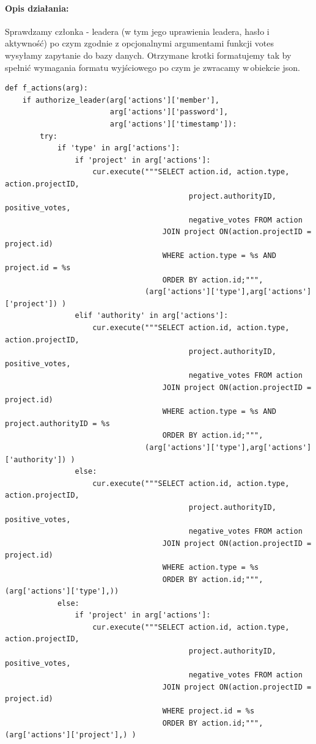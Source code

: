 \documentclass{article}
\begin{document}
\paragraph{Opis działania: }
Sprawdzamy członka - leadera (w tym jego uprawienia leadera, hasło i aktywność) po czym zgodnie z opcjonalnymi argumentami funkcji votes wysyłamy zapytanie do bazy danych.
Otrzymane krotki formatujemy tak by spełnić wymagania formatu wyjściowego po czym je zwracamy w\,obiekcie json. \newline
\begin{verbatim}
def f_actions(arg):
    if authorize_leader(arg['actions']['member'], 
                        arg['actions']['password'], 
                        arg['actions']['timestamp']):
        try:
            if 'type' in arg['actions']:
                if 'project' in arg['actions']:
                    cur.execute("""SELECT action.id, action.type, action.projectID,
                                          project.authorityID, positive_votes,
                                          negative_votes FROM action
                                    JOIN project ON(action.projectID = project.id)
                                    WHERE action.type = %s AND project.id = %s
                                    ORDER BY action.id;""",
                                (arg['actions']['type'],arg['actions']['project']) )
                elif 'authority' in arg['actions']:
                    cur.execute("""SELECT action.id, action.type, action.projectID,
                                          project.authorityID, positive_votes,
                                          negative_votes FROM action
                                    JOIN project ON(action.projectID = project.id)
                                    WHERE action.type = %s AND project.authorityID = %s
                                    ORDER BY action.id;""", 
                                (arg['actions']['type'],arg['actions']['authority']) )
                else:
                    cur.execute("""SELECT action.id, action.type, action.projectID,
                                          project.authorityID, positive_votes,
                                          negative_votes FROM action
                                    JOIN project ON(action.projectID = project.id)
                                    WHERE action.type = %s
                                    ORDER BY action.id;""", (arg['actions']['type'],))
            else:
                if 'project' in arg['actions']:
                    cur.execute("""SELECT action.id, action.type, action.projectID,
                                          project.authorityID, positive_votes,
                                          negative_votes FROM action
                                    JOIN project ON(action.projectID = project.id)
                                    WHERE project.id = %s
                                    ORDER BY action.id;""", (arg['actions']['project'],) )




\end{verbatim}
\end{document}

